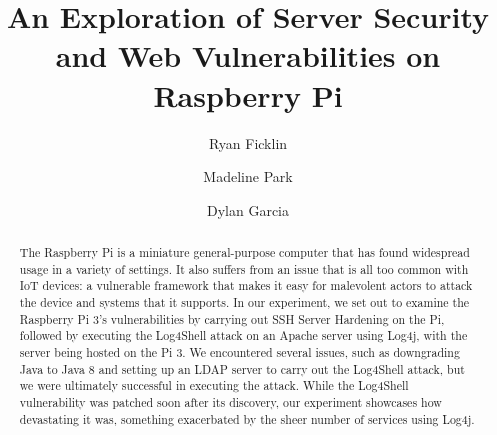 \documentclass[sigconf]{acmart}
\begin{document}
\title{An Exploration of Server Security and Web Vulnerabilities on Raspberry Pi}

\author{Ryan Ficklin}

\author{Madeline Park}

\author{Dylan Garcia}


\renewcommand{\shortauthors}{Ficklin et al.}

\begin{abstract}
The Raspberry Pi is a miniature general-purpose computer that has found widespread usage in a variety of settings. It also suffers
from an issue that is all too common with IoT devices: a vulnerable framework that makes it easy for malevolent actors to attack
the device and systems that it supports. In our experiment, we set out to examine the Raspberry Pi 3's vulnerabilities by carrying out 
SSH Server Hardening on the Pi, followed by executing the Log4Shell attack on an Apache server using Log4j, with the server being hosted 
on the Pi 3. We encountered several issues, such as downgrading Java to Java 8 and setting up an LDAP server to carry out the Log4Shell 
attack, but we were ultimately successful in executing the attack. While the Log4Shell vulnerability was patched soon after its discovery, our 
experiment showcases how devastating it was, something exacerbated by the sheer number of services using Log4j.

\end{abstract}
\end{document}

